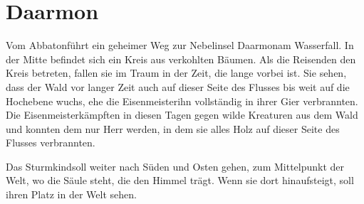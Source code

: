\documentclass[12pt,a4paper,onecolumn,twoside,ngerman]{book}
\newcommand{\Sturmkind}{Sturmkind}
\newcommand{\Darmon}{Daarmon}
\newcommand{\Eisenmeister}{Eisenmeister}
\newcommand{\Abaton}{Abbaton}
\begin{document}
\section{\Darmon}
Vom \Abaton führt ein geheimer Weg zur Nebelinsel \Darmon am Wasserfall. In der Mitte befindet sich ein Kreis aus verkohlten Bäumen. Als die Reisenden den Kreis betreten, fallen sie im Traum in der Zeit, die lange vorbei ist. Sie sehen, dass der Wald vor langer Zeit auch auf dieser Seite des Flusses bis weit auf die Hochebene wuchs, ehe die \Eisenmeister ihn vollständig in ihrer Gier verbrannten. Die \Eisenmeister kämpften in diesen Tagen gegen wilde Kreaturen aus dem Wald und konnten dem nur Herr werden, in dem sie alles Holz auf dieser Seite des Flusses verbrannten. 

Das \Sturmkind soll weiter nach Süden und Osten gehen, zum Mittelpunkt der Welt, wo die Säule steht, die den Himmel trägt. Wenn sie dort hinaufsteigt, soll ihren Platz in der Welt sehen.

\end{document}
